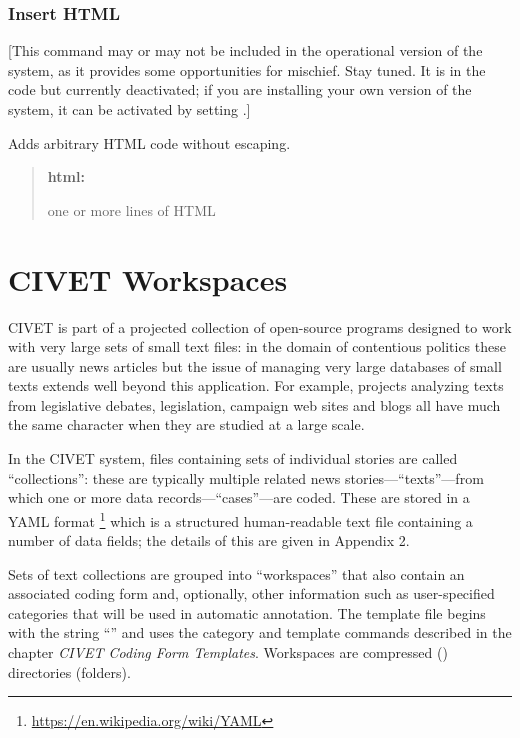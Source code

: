 \documentclass[letterpaper,10pt,english]{sphinxmanual}
\begin{document}
\subsection{Insert HTML}
\label{forms:insert-html}
{[}This command may or may not be included in the operational version of
the system, as it provides some opportunities for mischief. Stay tuned.
It is in the code but currently deactivated; if you are installing your
own version of the system, it can be activated by setting
.{]}

Adds arbitrary HTML code without escaping.
\begin{quote}

\begin{DUlineblock}{0em}
\item[] \textbf{html:}
\item[] one or more lines of HTML
\end{DUlineblock}
\end{quote}


\chapter{CIVET Workspaces}
\label{workspaces:civet-workspaces}\label{workspaces::doc}
CIVET is part of a projected collection of open-source programs designed
to work with very large sets of small text files: in the domain of
contentious politics these are usually news articles but the issue of
managing very large databases of small texts extends well beyond this
application. For example, projects analyzing texts from legislative
debates, legislation, campaign web sites and blogs all have much the
same character when they are studied at a large scale.

In the CIVET system, files containing sets of individual stories are
called “collections”: these are typically multiple related news
stories—“texts”—from which one or more data records—“cases”—are coded.
These are stored in a YAML format \footnote{
\href{https://en.wikipedia.org/wiki/YAML}{https://en.wikipedia.org/wiki/YAML}
} which is a structured
human-readable text file containing a number of data fields; the details
of this are given in Appendix 2.

Sets of text collections are grouped into “workspaces” that also contain
an associated coding form and, optionally, other information such as
user-specified categories that will be used in automatic annotation. The
template file begins with the string “” and uses the category
and template commands described in the chapter \emph{CIVET Coding Form Templates}.
Workspaces are compressed () directories (folders).
\end{document}
